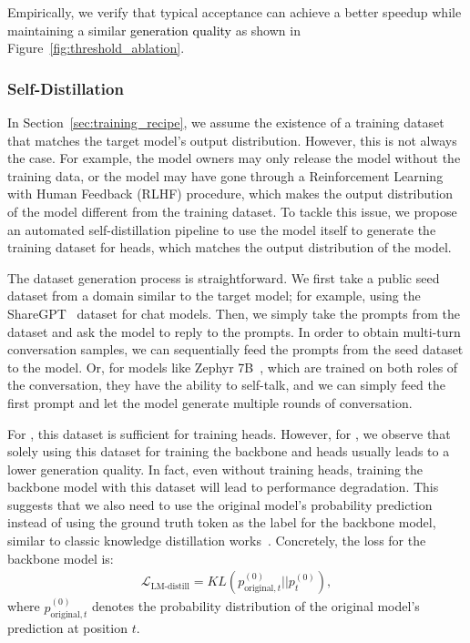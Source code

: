 Empirically, we verify that typical acceptance can achieve a better speedup while maintaining a similar \textcolor{black}{generation quality} as shown in Figure~\ref{fig:threshold_ablation}.
\subsubsection{Self-Distillation}
\label{sec:self_distillation}
In Section~\ref{sec:training_recipe}, we assume the existence of a training dataset that matches the target model's output distribution. However, this is not always the case. For example, the model owners may only release the model without the training data, or the model may have gone through a Reinforcement Learning with Human Feedback (RLHF) procedure, which makes the output distribution of the model different from the training dataset. To tackle this issue, we propose an automated self-distillation pipeline to use the model itself to generate the training dataset for \ours heads, which matches the output distribution of the model.

The dataset generation process is straightforward. We first take a public seed dataset from a domain similar to the target model; for example, using the ShareGPT~\citep{sharegpt2023} dataset for chat models. Then, we simply take the prompts from the dataset and ask the model to reply to the prompts. In order to obtain multi-turn conversation samples, we can sequentially feed the prompts from the seed dataset to the model. Or, for models like Zephyr 7B~\citep{tunstall2023zephyr}, which are trained on both roles of the conversation, they have the ability to self-talk, and we can simply feed the first prompt and let the model generate multiple rounds of conversation.

For , this dataset is sufficient for training \ours heads. However, for , we observe that solely using this dataset for training the backbone and \ours heads usually leads to a lower generation quality. In fact, even without training \ours heads, training the backbone model with this dataset will lead to performance degradation. This suggests that we also need to use the original model's probability prediction instead of using the ground truth token as the label for the backbone model, similar to classic knowledge distillation works~\citep{kim2016sequencelevel}. Concretely, the loss for the backbone model is:
\begin{align*}
    \mathcal{L}_{\text{LM-distill}} = KL(p_{\text{original},t}^{(0)}||p_t^{(0)}),
\end{align*}
where $p_{\text{original},t}^{(0)}$ denotes the probability distribution of the original model's prediction at position $t$.

